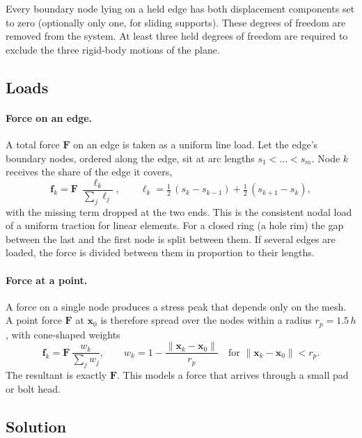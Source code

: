 \documentclass[11pt,a4paper]{article}
\newcommand{\vect}[1]{\mathbf{#1}}
\begin{document}
Every boundary node lying on a held edge has both displacement components
set to zero (optionally only one, for sliding supports). These degrees of
freedom are removed from the system. At least three held degrees of freedom
are required to exclude the three rigid-body motions of the plane.

\subsection{Loads}

\paragraph{Force on an edge.} A total force $\vect{F}$ on an edge is taken
as a uniform line load. Let the edge's boundary nodes, ordered along the
edge, sit at arc lengths $s_1<\dots<s_m$. Node $k$ receives the share of the
edge it covers,
\begin{equation}
  \vect{f}_k = \vect{F}\,\frac{\ell_k}{\sum_j \ell_j},
  \qquad
  \ell_k = \tfrac12\,(s_k - s_{k-1}) + \tfrac12\,(s_{k+1} - s_k),
\end{equation}
with the missing term dropped at the two ends. This is the consistent nodal
load of a uniform traction for linear elements. For a closed ring (a hole
rim) the gap between the last and the first node is split between them. If
several edges are loaded, the force is divided between them in proportion to
their lengths.

\paragraph{Force at a point.} A force on a single node produces a stress
peak that depends only on the mesh. A point force $\vect{F}$ at $\vect{x}_0$
is therefore spread over the nodes within a radius $r_p = 1.5\,h$, with
cone-shaped weights
\begin{equation}
  \vect{f}_k = \vect{F}\,\frac{w_k}{\sum_j w_j},
  \qquad
  w_k = 1 - \frac{\lVert \vect{x}_k - \vect{x}_0\rVert}{r_p}
  \quad\text{for } \lVert \vect{x}_k - \vect{x}_0\rVert < r_p .
\end{equation}
The resultant is exactly $\vect{F}$. This models a force that arrives
through a small pad or bolt head.

\subsection{Solution}
\end{document}
